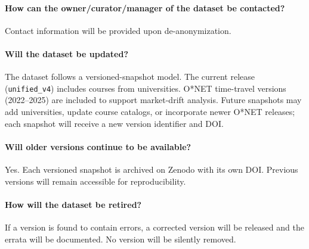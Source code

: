 \paragraph{How can the owner/curator/manager of the dataset be contacted?}
Contact information will be provided upon de-anonymization.

\paragraph{Will the dataset be updated?}
The dataset follows a versioned-snapshot model. The current release (\texttt{unified\_v4}) includes courses from \NumUniversities{} universities. O*NET time-travel versions (2022--2025) are included to support market-drift analysis. Future snapshots may add universities, update course catalogs, or incorporate newer O*NET releases; each snapshot will receive a new version identifier and DOI.

\paragraph{Will older versions continue to be available?}
Yes. Each versioned snapshot is archived on Zenodo with its own DOI. Previous versions will remain accessible for reproducibility.

\paragraph{How will the dataset be retired?}
If a version is found to contain errors, a corrected version will be released and the errata will be documented. No version will be silently removed.
